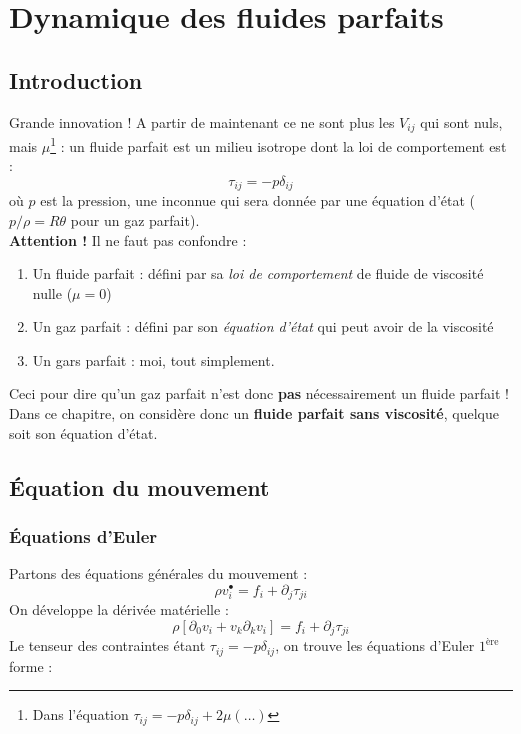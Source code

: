 \chapter{Dynamique des fluides parfaits}

\section{Introduction}
Grande innovation ! A partir de maintenant ce ne sont plus les $V_{ij}$ qui sont 
nuls, mais $\mu$\footnote{Dans l'équation $\tau_{ij} = -p\delta_{ij} + 2\mu
	(\dots)$} : un fluide parfait est un milieu isotrope dont la loi de comportement 
est :
\begin{equation}
	\tau_{ij} = -p\delta_{ij}
\end{equation}
où $p$ est la pression, une inconnue qui sera donnée par une équation d'état (
$p/\rho = R\theta$ pour un gaz parfait).\\
\textbf{Attention !} Il ne faut pas confondre :
\begin{enumerate}
	\item Un fluide parfait : défini par sa \textit{loi de comportement} de fluide de
	      viscosité nulle ($\mu = 0$)
	\item Un gaz parfait : défini par son \textit{équation d'état} qui peut avoir de
	      la viscosité
	\item Un gars parfait : moi, tout simplement.
\end{enumerate}
Ceci pour dire qu'un gaz parfait n'est donc \textbf{pas} nécessairement un fluide
parfait ! Dans ce chapitre, on considère donc un \textbf{fluide parfait sans 
viscosité}, quelque soit son équation d'état.


\section{Équation du mouvement}
\subsection{Équations d'Euler}
Partons des équations générales du mouvement :
\begin{equation}
	\rho v_i^\bullet = f_i + \partial_j \tau_{ji}
\end{equation}
On développe la dérivée matérielle :
\begin{equation}
	\rho[\partial_0v_i + v_k\partial_kv_i] = f_i + \partial_j\tau_{ji}
\end{equation}
Le tenseur des contraintes étant $\tau_{ij} = -p\delta_{ij}$, on trouve les
équations d'Euler $1^{\text{ère}}$ forme :\\
	
